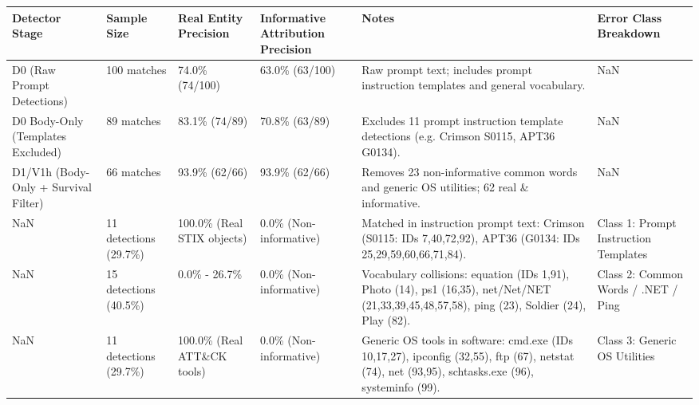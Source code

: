\begin{tabular}{llllll}
\toprule
Detector Stage & Sample Size & Real Entity Precision & Informative Attribution Precision & Notes & Error Class Breakdown \\
\midrule
D0 (Raw Prompt Detections) & 100 matches & 74.0\% (74/100) & 63.0\% (63/100) & Raw prompt text; includes prompt instruction templates and general vocabulary. & NaN \\
D0 Body-Only (Templates Excluded) & 89 matches & 83.1\% (74/89) & 70.8\% (63/89) & Excludes 11 prompt instruction template detections (e.g. Crimson S0115, APT36 G0134). & NaN \\
D1/V1h (Body-Only + Survival Filter) & 66 matches & 93.9\% (62/66) & 93.9\% (62/66) & Removes 23 non-informative common words and generic OS utilities; 62 real \& informative. & NaN \\
NaN & 11 detections (29.7\%) & 100.0\% (Real STIX objects) & 0.0\% (Non-informative) & Matched in instruction prompt text: Crimson (S0115: IDs 7,40,72,92), APT36 (G0134: IDs 25,29,59,60,66,71,84). & Class 1: Prompt Instruction Templates \\
NaN & 15 detections (40.5\%) & 0.0\% - 26.7\% & 0.0\% (Non-informative) & Vocabulary collisions: equation (IDs 1,91), Photo (14), ps1 (16,35), net/Net/NET (21,33,39,45,48,57,58), ping (23), Soldier (24), Play (82). & Class 2: Common Words / .NET / Ping \\
NaN & 11 detections (29.7\%) & 100.0\% (Real ATT\&CK tools) & 0.0\% (Non-informative) & Generic OS tools in software: cmd.exe (IDs 10,17,27), ipconfig (32,55), ftp (67), netstat (74), net (93,95), schtasks.exe (96), systeminfo (99). & Class 3: Generic OS Utilities \\
\bottomrule
\end{tabular}
